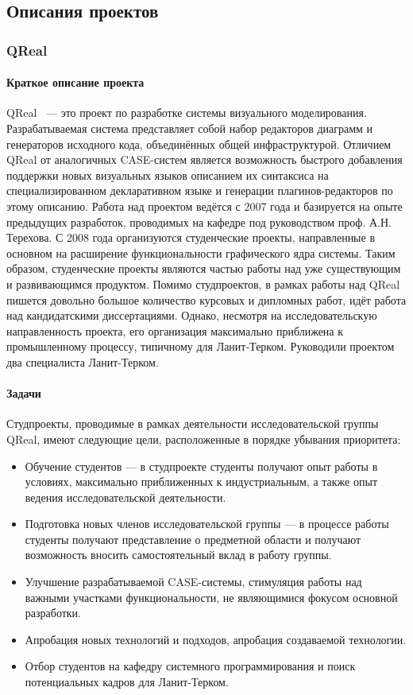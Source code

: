 \documentclass[a5paper]{article}
\begin{document}
\subsection{Описания проектов}
\subsubsection{QReal}
\paragraph {Краткое описание проекта}
QReal~\cite{qreal} --- это проект по разработке системы визуального моделирования. Разрабатываемая система представляет собой набор редакторов диаграмм и генераторов исходного кода, объединённых общей инфраструктурой. Отличием QReal от аналогичных CASE-систем является возможность быстрого добавления поддержки новых визуальных языков описанием их синтаксиса на специализированном декларативном языке и генерации плагинов-редакторов по этому описанию. Работа над проектом ведётся с 2007 года и базируется на опыте предыдущих разработок, проводимых на кафедре под руководством проф. А.Н. Терехова. С 2008 года организуются студенческие проекты, направленные в основном на расширение функциональности графического ядра системы. Таким образом, студенческие проекты являются частью работы над уже существующим и развивающимся продуктом. Помимо студпроектов, в рамках работы над QReal пишется довольно большое количество курсовых и дипломных работ, идёт работа над кандидатскими диссертациями. Однако, несмотря на исследовательскую направленность проекта, его организация максимально приближена к промышленному процессу, типичному для Ланит-Терком. Руководили проектом два специалиста Ланит-Терком.

\paragraph{Задачи}
Студпроекты, проводимые в рамках деятельности исследовательской группы QReal, имеют следующие цели, расположенные в порядке убывания приоритета:
\begin{itemize}
	\item Обучение студентов --- в студпроекте студенты получают опыт работы в условиях, максимально приближенных к индустриальным, а также опыт ведения исследовательской деятельности.
	\item Подготовка новых членов исследовательской группы --- в процессе работы студенты получают представление о предметной области и получают возможность вносить самостоятельный вклад в работу группы.
	\item Улучшение разрабатываемой CASE-системы, стимуляция работы над важными участками функциональности, не являющимися фокусом основной разработки.
	\item Апробация новых технологий и подходов, апробация создаваемой технологии.
	\item Отбор студентов на кафедру системного программирования и поиск потенциальных кадров для Ланит-Терком.
\end{itemize}
\end{document}
